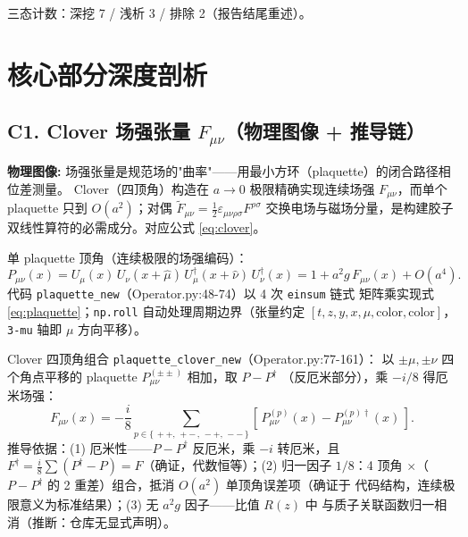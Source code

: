 \documentclass[UTF8]{ctexart}
\begin{document}
\noindent 三态计数：\textcolor{phys}{深挖 7 / 浅析 3 / 排除 2}（报告结尾重述）。

\section{核心部分深度剖析}

\subsection{C1. Clover 场强张量 $F_{\mu\nu}$（物理图像 + 推导链）}

\begin{physbox}
\textbf{物理图像:} 场强张量是规范场的"曲率"——用最小方环（plaquette）的闭合路径相位差测量。
Clover（四顶角）构造在 $a\to0$ 极限精确实现连续场强 $F_{\mu\nu}$，而单个 plaquette 只到
$O(a^2)$；对偶 $\tilde F_{\mu\nu}=\frac12\varepsilon_{\mu\nu\rho\sigma}F^{\rho\sigma}$
交换电场与磁场分量，是构建胶子双线性算符的必需成分。对应公式 \eqref{eq:clover}。
\end{physbox}

单 plaquette 顶角（连续极限的场强编码）：
\begin{equation}\label{eq:plaquette}
P_{\mu\nu}(x)=U_\mu(x)\,U_\nu(x+\hat\mu)\,U_\mu^\dagger(x+\hat\nu)\,U_\nu^\dagger(x)
=1+a^2g\,F_{\mu\nu}(x)+O(a^4).
\end{equation}
代码 \texttt{\nolinkurl{plaquette_new}}（Operator.py:48-74）以 4 次 \texttt{einsum} 链式
矩阵乘实现式 \eqref{eq:plaquette}；\texttt{np.roll} 自动处理周期边界（张量约定
$[t,z,y,x,\mu,\text{color},\text{color}]$，\texttt{3-mu} 轴即 $\mu$ 方向平移）。

Clover 四顶角组合 \texttt{\nolinkurl{plaquette_clover_new}}（Operator.py:77-161）：
以 $\pm\mu,\pm\nu$ 四个角点平移的 plaquette $P_{\mu\nu}^{(\pm\pm)}$ 相加，取 $P-P^\dagger$
（反厄米部分），乘 $-i/8$ 得厄米场强：
\begin{equation}\label{eq:clover}
F_{\mu\nu}(x)=-\frac{i}{8}\sum_{p\in\{\,++,\,+-\,,\,-+,\,--\,\}}
\left[\,P_{\mu\nu}^{(p)}(x)-P_{\mu\nu}^{(p)\dagger}(x)\,\right].
\end{equation}
\noindent 推导依据：\textcolor{phys}{(1)} 厄米性——$P-P^\dagger$ 反厄米，乘 $-i$ 转厄米，且
$F^\dagger = \frac{i}{8}\sum(P^\dagger-P)=F$（确证，代数恒等）；\textcolor{phys}{(2)} 归一因子
$1/8$：4 顶角 $\times$（$P-P^\dagger$ 的 2 重差）组合，抵消 $O(a^2)$ 单顶角误差项（确证于
代码结构，连续极限意义为标准结果）；\textcolor{phys}{(3)} 无 $a^2g$ 因子——比值 $R(z)$ 中
与质子关联函数归一相消（\textcolor{phys}{推断}：仓库无显式声明）。
\end{document}
